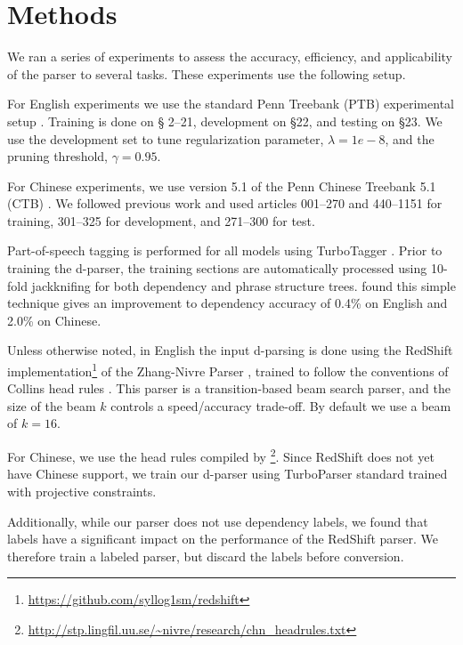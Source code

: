 \documentclass[11pt,letterpaper]{article}
\newcommand{\lpkcomment}[1]{\textcolor{red}{\bf \small [#1 --lpk]}}
\begin{document}
\section{Methods}

We ran a series of experiments to assess the accuracy, efficiency,
and applicability of the parser to several tasks. These experiments
use the following setup.  

For English experiments we use the standard Penn Treebank (PTB)
experimental setup \cite{marcus1993building}. Training is done on \S
2--21, development on \S 22, and testing on \S 23. We use the development set 
to tune 
regularization parameter, $\lambda=1e-8$, and the pruning threshold, $\gamma=0.95$.


For Chinese experiments, we use version 5.1 of the Penn  Chinese Treebank 5.1 (CTB) \cite{xue2005penn}. We followed previous work and used
articles 001--270 and 440--1151 for training, 
301--325 for development, and 
271--300 for test.

Part-of-speech tagging is performed for all models using TurboTagger
\cite{martins2013turning}.  Prior to training the d-parser, the
training sections are automatically processed using 10-fold
jackknifing \cite{collins2000} for both dependency and phrase
structure trees.  found this simple technique
gives an improvement to dependency accuracy of 0.4\% on English and
2.0\% on Chinese.

Unless otherwise noted, in English the input d-parsing is done using the RedShift
implementation\footnote{\url{https://github.com/syllog1sm/redshift}}
of the Zhang-Nivre Parser \cite{zhang2011transition}, trained to
follow the conventions of Collins head rules
\cite{collins2003head}. This parser is a transition-based beam search
parser, and the size of the beam $k$ controls a speed/accuracy trade-off.
By default we use a beam of $k=16$. 

For Chinese, we use the head rules compiled by
\footnote{\url{http://stp.lingfil.uu.se/~nivre/research/chn_headrules.txt}}. Since
RedShift does not yet have Chinese support, we train our d-parser
using TurboParser standard trained with projective constraints.


Additionally, while our parser does not use dependency labels, 
we found that labels have a significant impact on the performance of
the RedShift parser. We therefore train a labeled parser, but 
discard the labels before conversion.
\end{document}
